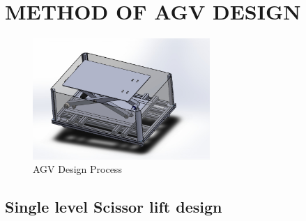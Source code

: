 \documentclass[../../main]{subfiles}
\begin{document}




\newpage
\section{METHOD OF AGV DESIGN}
\begin{figure}[ht]
  \centering
  \includegraphics[width=0.6\textwidth]{img/image1.jpg}
  \caption{AGV Design Process}
\end{figure}

\subsection{Single level Scissor lift design}
\end{document}
